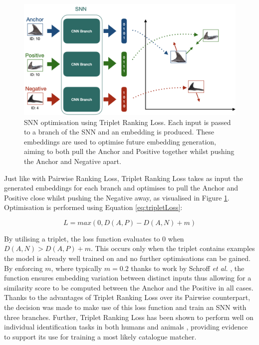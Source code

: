 \begin{figure}
	\begin{center}
		\includegraphics[scale=0.5]{Chapter6/figs/triplet-loss-eg-updated.png}
	\end{center}
	\caption[SNN optimisation using Triplet Ranking Loss.]{SNN optimisation using Triplet Ranking Loss. Each input is passed to a branch of the SNN and an embedding is produced. These embeddings are used to optimise future embedding generation, aiming to both pull the Anchor and Positive together whilst pushing the Anchor and Negative apart.}
	\label{fig:triplet-loss-eg}
\end{figure}

Just like with Pairwise Ranking Loss, Triplet Ranking Loss takes as input the generated embeddings for each branch and optimises to pull the Anchor and Positive close whilst pushing the Negative away, as visualised in Figure \ref{fig:triplet-loss-eg}. Optimisation is performed using Equation \ref{eq:tripletLoss}:

\begin{equation}
	\label{eq:tripletLoss}
	L = max(0, D(A, P) - D(A, N) + m)
\end{equation}

By utilising a triplet, the loss function evaluates to 0 when $D(A, N) > D(A, P) + m$. This occurs only when the triplet contains examples the model is already well trained on and no further optimisations can be gained. By enforcing $m$, where typically $m = 0.2$ thanks to work by Schroff \textit{et al.} \cite{schroff_facenet_2015}, the function ensures embedding variation between distinct inputs thus allowing for a similarity score to be computed between the Anchor and the Positive in all cases. Thanks to the advantages of Triplet Ranking Loss over its Pairwise counterpart, the decision was made to make use of this loss function and train an SNN with three branches. Further, Triplet Ranking Loss has been shown to perform well on individual identification tasks in both humans \cite{hermans_defense_2017} and animals \cite{vetrova_hidden_2018}, providing evidence to support its use for training a most likely catalogue matcher.

